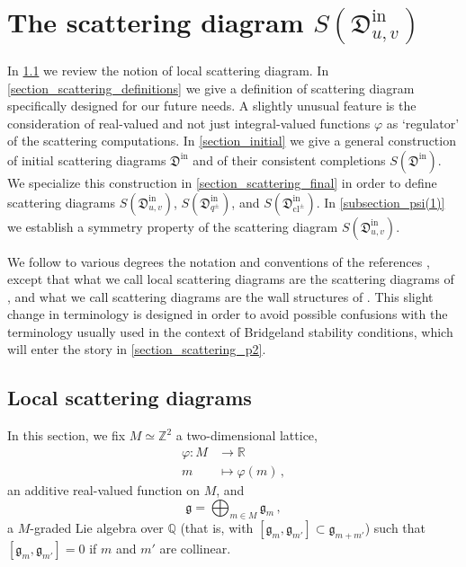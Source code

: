 \documentclass[12pt, a4paper]{amsart}
\newcommand\R{\mathbb R}
\newcommand\Q{\mathbb Q}
\newcommand\Z{\mathbb Z}
\newcommand\fD{\mathfrak D}
\newcommand\fg{\mathfrak g}
\newcommand\cl{\operatorname{cl}}
\newcommand\iin{\mathrm{in}}
\begin{document}
\section{The scattering diagram $S(\fD^{\iin}_{u,v})$}\label{section_scattering_diagram}
In \cref{section_local_scattering} we review the notion of local scattering diagram.
In \cref{section_scattering_definitions} we give a definition of scattering diagram specifically designed for our future needs. A slightly unusual
feature is the consideration of real-valued and not just integral-valued
functions $\varphi$ as `regulator' of the scattering computations.
In \cref{section_initial} we give a general construction of initial scattering diagrams 
$\fD^{\iin}$ and of their consistent completions $S(\fD^{\iin})$. We specialize 
this construction in  \cref{section_scattering_final} in order to define scattering diagrams $S(\fD^\iin_{u,v})$, $S(\fD^\iin_{q^\pm})$, and $S(\fD^\iin_{\cl^\pm})$.
In \cref{subsection_psi(1)} we establish a symmetry property of the scattering diagram $S(\fD^\iin_{u,v})$.

 We follow to various degrees the notation and conventions of the references 
\cite{MR2846484, MR2667135, MR2722115, bousseau2018quantum_tropical}, except that what we call local scattering diagrams are the scattering diagrams of \cite{MR2846484}, and what we call scattering diagrams are the wall structures
of \cite{MR2846484}. This slight change in terminology is designed in order to avoid possible confusions with the terminology usually used in the context of Bridgeland stability conditions, which will enter the story in \cref{section_scattering_p2}.



\subsection{Local scattering diagrams}
\label{section_local_scattering}
In this section, we fix
$M \simeq \Z^2$ a two-dimensional lattice,
\begin{align*} \varphi \colon M &\longrightarrow \R \\
 m &\longmapsto \varphi(m)\,,\end{align*}
an additive real-valued function on $M$,
and 
\[\fg=\bigoplus_{m \in M} \fg_m \,,\] 
a $M$-graded Lie algebra over 
$\Q$ (that is, with $[\fg_{m},\fg_{m'}]\subset 
\fg_{m+m'}$) such that 
$[\fg_m,\fg_{m'}]=0$ if 
$m$ and $m'$ are collinear. 
\end{document}

